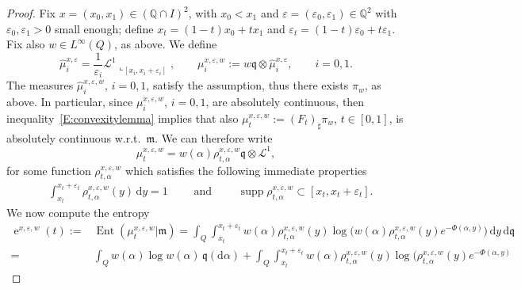 \documentclass[12pt,a4paper]{amsart}
\theoremstyle{plain}
\theoremstyle{definition}
\numberwithin{equation}{section}
\let\temp\phi
\let\phi\varphi
\let\temp\epsilon
\let\epsilon\varepsilon
\let\varepsilon\temp
\newcommand{\Q}{\mathbb{Q}}
\DeclareMathOperator{\Ent}{Ent}
\DeclareMathOperator{\ee}{e}
\DeclareMathOperator{\supp}{supp}
\newcommand{\de}{{\mathrm{d}}}
\newcommand{\Leb}{\mathcal{L}}
\renewcommand{\L}{\mathcal{L}}
\newcommand{\q}{\mathfrak{q}}
\newcommand{\mm}{\mathfrak m}
\begin{document}
\begin{proof}
  Fix $x=(x_0,x_1)\in(\Q\cap I)^2$, with $x_0<x_1$ and
  $\epsilon=(\epsilon_0,\epsilon_1)\in \Q^2$ with
  $\epsilon_0,\epsilon_1>0$ small enough; define  $x_t=(1-t)x_0+t x_1$ and
  $\epsilon_t=(1-t)\epsilon_0+t\epsilon_1$.
  Fix also $w\in L^\infty(Q)$, as above.
  We define
  \begin{equation*}
    \hat\mu_i^{x,\epsilon}
    =
    \frac{1}{\epsilon_i}
    \L^1\llcorner_{[x_i,x_i+\epsilon_i]},
    \qquad
    \mu_i^{x,\epsilon,w}
    :=
    w\q\otimes
    \hat\mu_i^{x,\epsilon}
    ,
    \qquad
    i=0,1
    .
  \end{equation*}
  The measures $\hat\mu_i^{x,\epsilon,w}$, $i=0,1$, satisfy the
  assumption, thus there exists $\pi_w$, as above.
  In particular, since $\mu_i^{x,\epsilon,w}$, $i=0,1$, are absolutely
  continuous, then inequality~\eqref{E:convexitylemma} implies that
  also $\mu_t^{x,\epsilon,w}:=(F_t)_{\sharp}\pi_w$,
  $t\in[0,1]$, is absolutely continuous w.r.t.\ $\mm$.
  We can therefore write
  \begin{equation}
    \mu_t^{x,\epsilon,w}
    =
    w(\alpha)
    \rho^{x,\epsilon,w}_{t,\alpha}
    \q
    \otimes \Leb^1
    ,
  \end{equation}
  for some function $ \rho^{x,\epsilon,w}_{t,\alpha}$ which satisfies
  the following immediate properties
  \begin{align}
    &
      \int_{x_t}^{x_t+\epsilon_t}
          \rho^{x,\epsilon,w}_{t,\alpha}(y)
      \,
      \de y
      =1
      \qquad
      \text{ and }
      \qquad
      \supp     \rho^{x,\epsilon,w}_{t,\alpha}
      \subset
      [x_t,x_t+\epsilon_t]
      .
  \end{align}
  We now compute the entropy
  \begin{align*}
    \ee^{x,\epsilon,w}(t)
    :=&
        \Ent(\mu_t^{x,\epsilon,w}|\mm)
        =
        \int_Q
        \int_{x_t}^{x_t+\epsilon_t}
         w(\alpha)
         \rho^{x,\epsilon,w}_{t,\alpha}(y)
    \log
    \big(
        w(\alpha)
        \rho^{x,\epsilon,w}_{t,\alpha}(y)
        e^{-\Phi(\alpha,y)}
        \big)
        \,
        \de y
        \,
        \de\q
    \\
    =
      &
      \int_Q
      w(\alpha)
      \log
      w(\alpha)
      \,
      \q(\de\alpha)
      +
        \int_Q
        \int_{x_t}^{x_t+\epsilon_t}
         w(\alpha)
         \rho^{x,\epsilon,w}_{t,\alpha}(y)
    \log
    \big(
        \rho^{x,\epsilon,w}_{t,\alpha}(y)
        e^{-\Phi(\alpha,y)}

\end{align*}
\end{proof}
\end{document}
